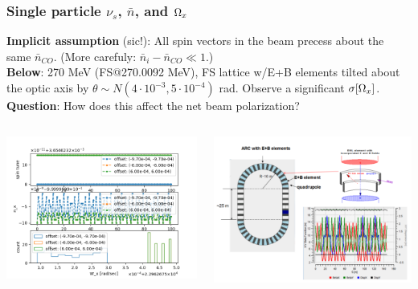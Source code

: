 \documentclass{beamer}
\begin{document}
\begin{frame}
  \frametitle{Single particle $\nu_s$, $\bar n$, and $\Omega_x$}
  \textbf{Implicit assumption} (sic!): All spin vectors in the beam precess about the same $\bar n_{CO}$. (More carefuly: $\bar n_i - \bar n_{CO} \ll 1$.)\\
  \textbf{Below}: 270 MeV (FS@270.0092 MeV), FS lattice w/E+B elements tilted about the optic axis by $\theta\sim N(4\cdot10^{-3}, 5\cdot10^{-4})$ rad. Observe a significant $\sigma[\Omega_x]$.\\
  \textbf{Question}: How does this affect the net beam polarization?
  \vspace*{-.5cm}
  \begin{columns}
    \begin{column}{.5\textwidth}
      \begin{center}
        \includegraphics[height=.5\paperheight]{img/spin_axis_motion/presentation/spin_tune_three}
      \end{center}
    \end{column}
    \begin{column}{.5\textwidth}
      \begin{center}
        \includegraphics[height=.5\paperheight]{img/spin_axis_motion/presentation/lattice}

\end{center}
\end{column}
\end{columns}
\end{frame}
\end{document}
